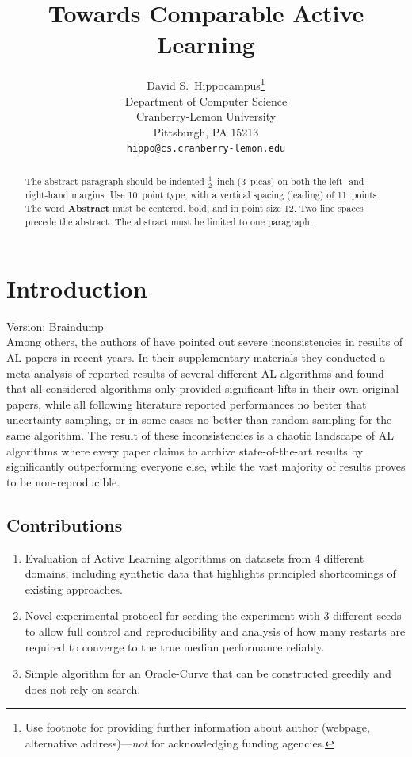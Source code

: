 \documentclass[]{article}
\title{Towards Comparable Active Learning}
\author{%
	David S.~Hippocampus\thanks{Use footnote for providing further information
		about author (webpage, alternative address)---\emph{not} for acknowledging
		funding agencies.} \\
	Department of Computer Science\\
	Cranberry-Lemon University\\
	Pittsburgh, PA 15213 \\
	\texttt{hippo@cs.cranberry-lemon.edu} \\
}
\begin{document}
\maketitle

\begin{abstract}
	The abstract paragraph should be indented $\frac{1}{2}$~inch (3~picas) on
	both the left- and right-hand margins. Use 10~point type, with a vertical
	spacing (leading) of 11~points.  The word \textbf{Abstract} must be centered,
	bold, and in point size 12. Two line spaces precede the abstract. The abstract
	must be limited to one paragraph.
\end{abstract}

\section{Introduction}
{\color{red} Version: Braindump}\\
Among others, the authors of \cite{zhou2021towards} have pointed out severe inconsistencies in results of AL papers in recent years. 
In their supplementary materials they conducted a meta analysis of reported results of several different AL algorithms and found that all considered algorithms only provided significant lifts in their own original papers, while all following literature reported performances no better that uncertainty sampling, or in some cases no better than random sampling for the same algorithm.
The result of these inconsistencies is a chaotic landscape of AL algorithms where every paper claims to archive state-of-the-art results by significantly outperforming everyone else, while the vast majority of results proves to be non-reproducible.

\subsection{Contributions}
\begin{enumerate}
	\item Evaluation of Active Learning algorithms on datasets from 4 different domains, including synthetic data that highlights principled shortcomings of existing approaches.
	\item Novel experimental protocol for seeding the experiment with 3 different seeds to allow full control and reproducibility and analysis of how many restarts are required to converge to the true median performance reliably.
	\item Simple algorithm for an Oracle-Curve that can be constructed greedily and does not rely on search.
\end{enumerate}
\end{document}
